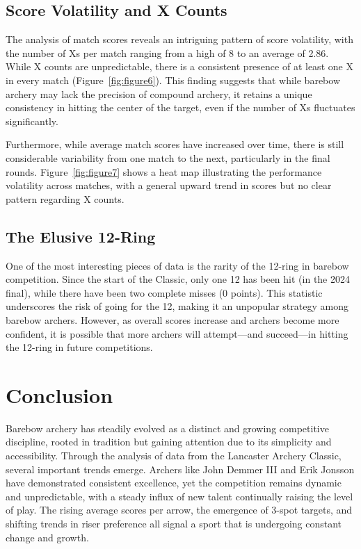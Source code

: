 \documentclass{article}
\begin{document}
\subsection{Score Volatility and X Counts}
The analysis of match scores reveals an intriguing pattern of score volatility, with the number of Xs per match ranging from a high of 8 to an average of 2.86. While X counts are unpredictable, there is a consistent presence of at least one X in every match (Figure~\ref{fig:figure6}). This finding suggests that while barebow archery may lack the precision of compound archery, it retains a unique consistency in hitting the center of the target, even if the number of Xs fluctuates significantly.

Furthermore, while average match scores have increased over time, there is still considerable variability from one match to the next, particularly in the final rounds. Figure~\ref{fig:figure7} shows a heat map illustrating the performance volatility across matches, with a general upward trend in scores but no clear pattern regarding X counts.

\subsection{The Elusive 12-Ring}
One of the most interesting pieces of data is the rarity of the 12-ring in barebow competition. Since the start of the Classic, only one 12 has been hit (in the 2024 final), while there have been two complete misses (0 points). This statistic underscores the risk of going for the 12, making it an unpopular strategy among barebow archers. However, as overall scores increase and archers become more confident, it is possible that more archers will attempt—and succeed—in hitting the 12-ring in future competitions.

\section{Conclusion}
Barebow archery has steadily evolved as a distinct and growing competitive discipline, rooted in tradition but gaining attention due to its simplicity and accessibility. Through the analysis of data from the Lancaster Archery Classic, several important trends emerge. Archers like John Demmer III and Erik Jonsson have demonstrated consistent excellence, yet the competition remains dynamic and unpredictable, with a steady influx of new talent continually raising the level of play. The rising average scores per arrow, the emergence of 3-spot targets, and shifting trends in riser preference all signal a sport that is undergoing constant change and growth.
\end{document}
